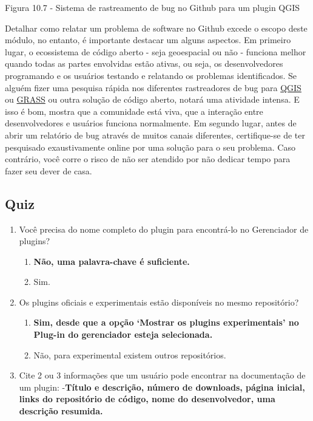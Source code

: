 \documentclass[
]{krantz}
\providecommand{\tightlist}{%
  \setlength{\itemsep}{0pt}\setlength{\parskip}{0pt}}
\begin{document}
Figura 10.7 - Sistema de rastreamento de bug no Github para um plugin QGIS

Detalhar como relatar um problema de software no Github excede o escopo deste módulo, no entanto, é importante destacar um alguns aspectos. Em primeiro lugar, o ecossistema de código aberto - seja geoespacial ou não - funciona melhor quando todas as partes envolvidas estão ativas, ou seja, os desenvolvedores programando e os usuários testando e relatando os problemas identificados. Se alguém fizer uma pesquisa rápida nos diferentes rastreadores de bug para \href{https://github.com/qgis/QGIS/issues}{QGIS} ou \href{https://github.com/OSGeo/grass/issues}{GRASS} ou outra solução de código aberto, notará uma atividade intensa. E isso é bom, mostra que a comunidade está viva, que a interação entre desenvolvedores e usuários funciona normalmente. Em segundo lugar, antes de abrir um relatório de bug através de muitos canais diferentes, certifique-se de ter pesquisado exaustivamente online por uma solução para o seu problema. Caso contrário, você corre o risco de não ser atendido por não dedicar tempo para fazer seu dever de casa.

\hypertarget{quiz-24}{%
\subsection{Quiz}\label{quiz-24}}

\begin{enumerate}
\def\labelenumi{\arabic{enumi}.}
\tightlist
\item
  Você precisa do nome completo do plugin para encontrá-lo no Gerenciador de plugins?

  \begin{enumerate}
  \def\labelenumii{\alph{enumii}.}
  \tightlist
  \item
    \textbf{Não, uma palavra-chave é suficiente.}
  \item
    Sim.
  \end{enumerate}
\item
  Os plugins oficiais e experimentais estão disponíveis no mesmo repositório?

  \begin{enumerate}
  \def\labelenumii{\alph{enumii}.}
  \tightlist
  \item
    \textbf{Sim, desde que a opção `Mostrar os plugins experimentais' no Plug-in do gerenciador esteja selecionada.}
  \item
    Não, para experimental existem outros repositórios.
  \end{enumerate}
\item
  Cite 2 ou 3 informações que um usuário pode encontrar na documentação de um plugin:
  -\textbf{Título e descrição, número de downloads, página inicial, links do repositório de código, nome do desenvolvedor, uma descrição resumida.}
\end{enumerate}
\end{document}
